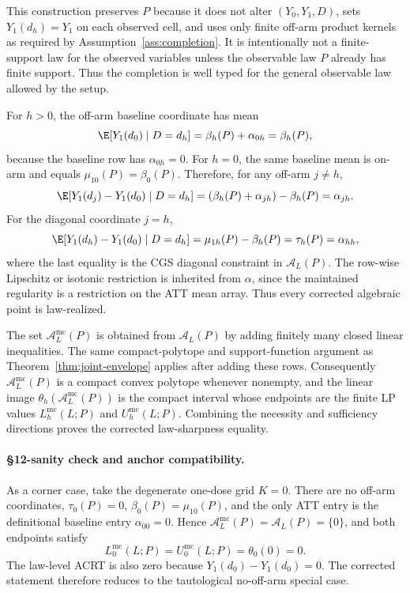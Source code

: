 This construction preserves \(P\) because it does not alter
\((Y_0,Y_1,D)\), sets \(Y_1(d_h)=Y_1\) on each observed cell, and uses only
finite off-arm product kernels as required by Assumption~\ref{ass:completion}.
It is intentionally not a finite-support law for the observed variables unless
the observable law \(P\) already has finite support.  Thus the completion is
well typed for the general observable law allowed by the setup.

For \(h>0\), the off-arm baseline coordinate has mean
\[
  \E[Y_1(d_0)\mid D=d_h]=\beta_h(P)+\alpha_{0h}=\beta_h(P),
\]
because the baseline row has \(\alpha_{0h}=0\).  For \(h=0\), the same baseline
mean is on-arm and equals \(\mu_{10}(P)=\beta_0(P)\).  Therefore, for any
off-arm \(j\ne h\),
\[
  \E[Y_1(d_j)-Y_1(d_0)\mid D=d_h]
  =
  (\beta_h(P)+\alpha_{jh})-\beta_h(P)
  =
  \alpha_{jh}.
\]
For the diagonal coordinate \(j=h\),
\[
  \E[Y_1(d_h)-Y_1(d_0)\mid D=d_h]
  =
  \mu_{1h}(P)-\beta_h(P)
  =
  \tau_h(P)
  =
  \alpha_{hh},
\]
where the last equality is the CGS diagonal constraint in \(\mathcal A_L(P)\).
The row-wise Lipschitz or isotonic restriction is inherited from \(\alpha\),
since the maintained regularity is a restriction on the ATT mean array.  Thus
every corrected algebraic point is law-realized.

The set \(\mathcal A_L^{\mathrm{mc}}(P)\) is obtained from
\(\mathcal A_L(P)\) by adding finitely many closed linear inequalities.  The
same compact-polytope and support-function argument as
Theorem~\ref{thm:joint-envelope} applies after adding these rows.  Consequently
\(\mathcal A_L^{\mathrm{mc}}(P)\) is a compact convex polytope whenever
nonempty, and the linear image
\(\theta_h(\mathcal A_L^{\mathrm{mc}}(P))\) is the compact interval whose
endpoints are the finite LP values
\(L_h^{\mathrm{mc}}(L;P)\) and \(U_h^{\mathrm{mc}}(L;P)\).  Combining the
necessity and sufficiency directions proves the corrected law-sharpness
equality.

\paragraph{\S12-sanity check and anchor compatibility.}
As a corner case, take the degenerate one-dose grid \(K=0\).  There are no
off-arm coordinates, \(\tau_0(P)=0\), \(\beta_0(P)=\mu_{10}(P)\), and the only
ATT entry is the definitional baseline entry \(\alpha_{00}=0\).  Hence
\(\mathcal A_L^{\mathrm{mc}}(P)=\mathcal A_L(P)=\{0\}\), and both endpoints
satisfy
\[
  L_0^{\mathrm{mc}}(L;P)=U_0^{\mathrm{mc}}(L;P)=\theta_0(0)=0.
\]
The law-level ACRT is also zero because \(Y_1(d_0)-Y_1(d_0)=0\).  The corrected
statement therefore reduces to the tautological no-off-arm special case.

